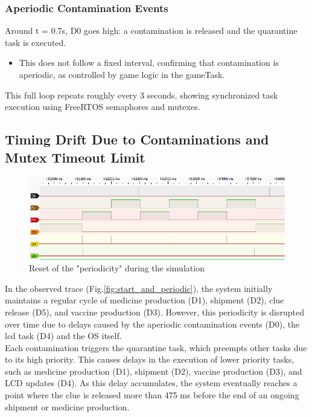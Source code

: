 \documentclass[a4paper, twoside, 12pt]{article}
\begin{document}
\subsubsection{Aperiodic Contamination Events}
Around t = 0.7s, D0 goes high: a contamination is released and the quarantine task is executed.
\begin{itemize}
	\setlength\itemsep{0em}
	\item This does not follow a fixed interval, confirming that contamination is aperiodic, as controlled by game logic in the gameTask.
\end{itemize}


This full loop repeats roughly every 3 seconds, showing synchronized task execution using FreeRTOS semaphores and mutexes.

\subsection{Timing Drift Due to Contaminations and Mutex Timeout Limit}

\begin{figure}[ht!]
	\centering
	\includegraphics[width=1\linewidth]{../run_pulseview/delayed2.png}
	\caption{Reset of the "periodicity" during the simulation}
	\label{fig:delayed}
\end{figure}

In the observed trace (Fig.\ref{fig:start_and_periodic}), the system initially maintains a regular cycle of medicine production (D1), shipment (D2), clue release (D5), and vaccine production (D3). However, this periodicity is disrupted over time due to delays caused by the aperiodic contamination events (D0), the lcd task (D4) and the OS itself.\\
Each contamination triggers the quarantine task, which preempts other tasks due to its high priority. This causes delays in the execution of lower priority tasks, such as medicine production (D1), shipment (D2), vaccine production (D3), and LCD updates (D4). As this delay accumulates, the system eventually reaches a point where the clue is released more than 475 ms before the end of an ongoing shipment or medicine production.
\end{document}
